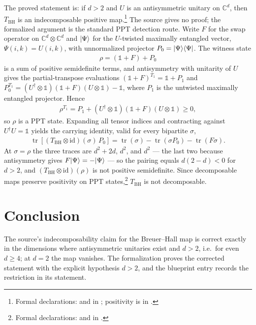 \documentclass{article}
\begin{document}
The proved statement is: if $d>2$ and $U$ is an antisymmetric unitary on
$\mathbb C^{d}$, then $T_{\mathrm{BH}}$ is an indecomposable positive
map.\footnote{Formal declarations:
 and
 in
; positivity is
 in
.}
The source gives no proof; the formalized argument is the standard PPT
detection route. Write $F$ for the swap operator on
$\mathbb C^{d}\otimes\mathbb C^{d}$ and $|\Psi\rangle$ for the $U$-twisted
maximally entangled vector, $\Psi(i,k)=U(i,k)$, with unnormalized projector
$P_{0}=|\Psi\rangle\langle \Psi|$. The witness state
\begin{align}
  \rho=(\mathbb 1+F)+P_{0}
\end{align}
is a sum of positive semidefinite terms, and antisymmetry with unitarity of
$U$ gives the partial-transpose evaluations
$(\mathbb 1+F)^{T_{1}}=\mathbb 1+P_{1}$ and
$P_{0}^{T_{1}}=(U^{\dagger}\otimes\mathbb 1)(\mathbb 1+F)(U\otimes\mathbb 1)
-\mathbb 1$, where $P_{1}$ is the untwisted maximally entangled projector.
Hence
\begin{align}
  \rho^{T_{1}}=P_{1}+(U^{\dagger}\otimes\mathbb 1)(\mathbb 1+F)(U\otimes\mathbb 1)
  \ge0,
\end{align}
so $\rho$ is a PPT state. Expanding all tensor indices and contracting
against $U^{\dagger}U=\mathbb 1$ yields the carrying identity, valid for
every bipartite $\sigma$,
\begin{align}
  \operatorname{tr}[(T_{\mathrm{BH}}\otimes\mathrm{id})(\sigma)\,P_{0}]
  =\operatorname{tr}(\sigma)-\operatorname{tr}(\sigma P_{0})
  -\operatorname{tr}(F\sigma).
\end{align}
At $\sigma=\rho$ the three traces are $d^{2}+2d$, $d^{2}$, and $d^{2}$ ---
the last two because antisymmetry gives $F|\Psi\rangle=-|\Psi\rangle$ --- so the
pairing equals $d(2-d)<0$ for $d>2$, and
$(T_{\mathrm{BH}}\otimes\mathrm{id})(\rho)$ is not positive semidefinite.
Since decomposable maps preserve positivity on PPT
states,\footnote{Formal declarations:
 and
in .}
$T_{\mathrm{BH}}$ is not decomposable.

\section{Conclusion}

The source's indecomposability claim for the Breuer--Hall map is correct
exactly in the dimensions where antisymmetric unitaries exist and $d>2$,
i.e.\ for even $d\ge4$; at $d=2$ the map vanishes. The formalization proves
the corrected statement with the explicit hypothesis $d>2$, and the
blueprint entry records the restriction in its statement.



\end{document}
